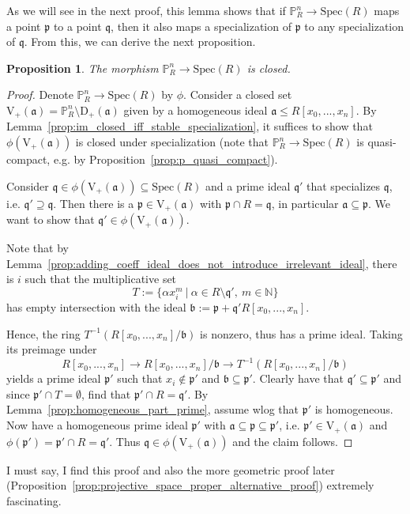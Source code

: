 \documentclass{scrartcl}
\newcommand{\N}{\mathbb{N}}
\newcommand{\V}[1]{\mathrm{V}_+(#1)}
\newcommand{\D}[1]{\mathrm{D}_+(#1)}
\renewcommand{\P}{\mathbb{P}}
\newcommand{\p}{\mathfrak{p}}
\newcommand{\q}{\mathfrak{q}}
\renewcommand{\a}{\mathfrak{a}}
\renewcommand{\b}{\mathfrak{b}}
\newcommand{\Spec}{\mathrm{Spec}}
\newtheorem{prop}[subsection]{Proposition}
\theoremstyle{definition}
\begin{document}
As we will see in the next proof, this lemma shows that if $\P_R^n \to \Spec(R)$ maps a point $\p$ to a point $\q$, then it also maps a specialization of $\p$ to any specialization of $\q$.
From this, we can derive the next proposition.
\begin{prop}
    \label{prop:projective_structure_morphism_closed}
    The morphism $\P_R^n \to \Spec(R)$ is closed.
\end{prop}
\begin{proof}
    Denote $\P_R^n \to \Spec(R)$ by $\phi$.
    Consider a closed set $\V{\a} = \P_R^n \setminus \D{\a}$ given by a homogeneous ideal $\a \leq R[x_0, ..., x_n]$.
    By Lemma~\ref{prop:im_closed_iff_stable_specialization}, it suffices to show that $\phi(\V{\a})$ is closed under specialization (note that $\P_R^n \to \Spec(R)$ is quasi-compact, e.g. by Proposition~\ref{prop:p_quasi_compact}).

    Consider $\q \in \phi(\V{\a}) \subseteq \Spec(R)$ and a prime ideal $\q'$ that specializes $\q$, i.e. $\q' \supseteq \q$.
    Then there is a $\p \in \V{\a}$ with $\p \cap R = \q$, in particular $\a \subseteq \p$.
    We want to show that $\q' \in \phi(\V{\a})$.

    Note that by Lemma~\ref{prop:adding_coeff_ideal_does_not_introduce_irrelevant_ideal}, there is $i$ such that the multiplicative set
    \begin{equation*}
        T := \{ \alpha x_i^m \ | \ \alpha \in R \setminus \q', \ m \in \N \}
    \end{equation*}
    has empty intersection with the ideal $\b := \p + \q' R[x_0, ..., x_n]$.
    
    Hence, the ring $T^{-1}(R[x_0, ..., x_n]/\b)$ is nonzero, thus has a prime ideal.
    Taking its preimage under
    \begin{equation*}
        R[x_0, ..., x_n] \to R[x_0, ..., x_n]/\b \to T^{-1}(R[x_0, ..., x_n]/\b)
    \end{equation*}
    yields a prime ideal $\p'$ such that $x_i \notin \p'$ and $\b \subseteq \p'$.
    Clearly have that $\q' \subseteq \p'$ and since $\p' \cap T = \emptyset$, find that $\p' \cap R = \q'$.
    By Lemma~\ref{prop:homogeneous_part_prime}, assume wlog that $\p'$ is homogeneous.
    Now have a homogeneous prime ideal $\p'$ with $\a \subseteq \p \subseteq \p'$, i.e. $\p' \in \V{\a}$ and $\phi(\p') = \p' \cap R = \q'$.
    Thus $\q \in \phi(\V{\a})$ and the claim follows.
\end{proof}
I must say, I find this proof and also the more geometric proof later (Proposition~\ref{prop:projective_space_proper_alternative_proof}) extremely fascinating.
\end{document}
